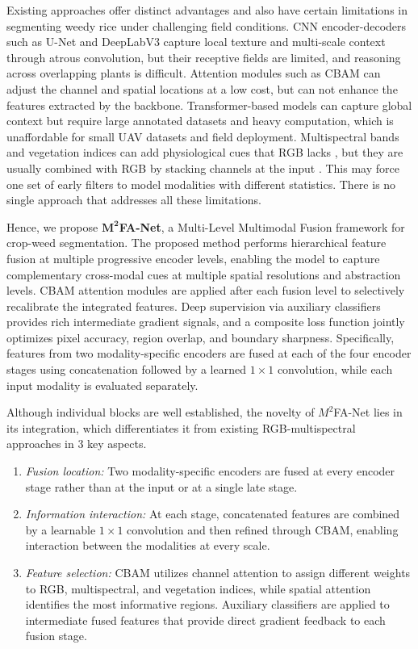 \documentclass[pdflatex,sn-mathphys-num]{sn-jnl}
\begin{document}
Existing approaches offer distinct advantages and also have certain limitations in segmenting weedy rice under challenging field conditions. CNN encoder-decoders such as U-Net and DeepLabV3 capture local texture and multi-scale context through atrous convolution, but their receptive fields are limited, and reasoning across overlapping plants is difficult. Attention modules such as CBAM can adjust the channel and spatial locations at a low cost, but can not enhance the features extracted by the backbone. Transformer-based models can capture global context but require large annotated datasets and heavy computation, which is unaffordable for small UAV datasets and field deployment. Multispectral bands and vegetation indices can add physiological cues that RGB lacks \cite{ma2024vegetation_dl}, but they are usually combined with RGB by stacking channels at the input \cite{li2022attention_agriculture,yang2025rshrnet}. This may force one set of early filters to model modalities with different statistics. There is no single approach that addresses all these limitations.



Hence, we propose \textbf{$\mathbf{M^2}$FA-Net}, a Multi-Level Multimodal Fusion framework for crop-weed segmentation.
The proposed method performs hierarchical feature fusion at multiple progressive encoder levels, enabling the model to capture complementary cross-modal cues at multiple spatial resolutions and
abstraction levels. CBAM attention modules are applied after each fusion level to selectively recalibrate the integrated
features. Deep supervision via auxiliary classifiers provides rich intermediate gradient signals, and a composite loss
function jointly optimizes pixel accuracy, region overlap, and boundary sharpness. Specifically, features from two modality-specific encoders are fused at each of the four encoder stages using concatenation followed by a learned $1\times1$ convolution, while each input modality is evaluated separately.

Although individual blocks are well established, the novelty of $M^2$FA-Net lies in its integration, which differentiates it from existing RGB-multispectral approaches in 3 key aspects.
\begin{enumerate}
    \item\textit{Fusion location:} Two modality-specific encoders are fused at every encoder stage rather than at the input or at a single late stage. 
    \item \textit{Information interaction:} At each stage, concatenated features are combined by a learnable $1\times1$ convolution and then refined through CBAM, enabling interaction between the modalities at every scale. 
    \item \textit{Feature selection:} CBAM utilizes channel attention to assign different weights to RGB, multispectral, and vegetation indices, while spatial attention identifies the most informative regions. Auxiliary classifiers are applied to intermediate fused features that provide direct gradient feedback to each fusion stage.
\end{enumerate}
\end{document}
